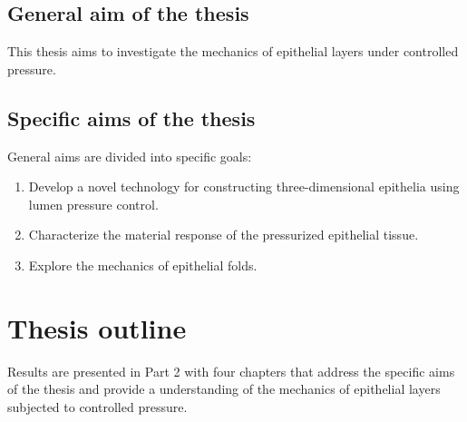 \subsection*{General aim of the thesis} 

This thesis aims to investigate the mechanics of epithelial layers under controlled pressure.  

\subsection*{Specific aims of the thesis} 
General aims are divided into specific goals:

\begin{enumerate}
\def\labelenumi{\arabic{enumi}.}
\item  Develop a novel technology for constructing three-dimensional epithelia using lumen pressure control.  
\item  Characterize the material response of the pressurized epithelial tissue.  
\item  Explore the mechanics of epithelial folds.
\end{enumerate}

\hypertarget{thesis-outline}{%
\section{Thesis outline}\label{thesis-outline}}

Results are presented in Part 2 with four chapters that address the specific aims of the thesis and provide a understanding of the mechanics of epithelial layers subjected to controlled pressure.  

